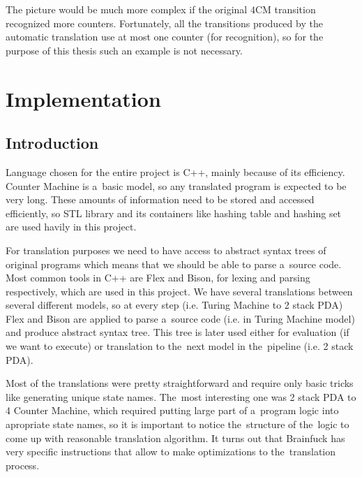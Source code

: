 \documentclass[english,shortabstract,mgr]{iithesis}
\begin{document}
The picture would be much more complex if the original $4$CM transition
recognized more counters. Fortunately, all the transitions produced by
the automatic translation use at most one counter (for recognition),
so for the purpose of this thesis such an example is not necessary.

\chapter{Implementation}

\section{Introduction}

Language chosen for the entire project is C++, mainly because of its efficiency. Counter Machine
is a~basic model, so any translated program is expected to be very long. These amounts of information
need to be stored and accessed efficiently, so STL library and its containers like hashing table
and hashing set are used havily in this project.

For translation purposes we need to have access to abstract syntax trees of original programs which
means that we should be able to parse a~source code. Most common tools in C++ are Flex and Bison,
for lexing and parsing respectively, which are used in this project. We have several translations
between several different models, so at every step (i.e. Turing Machine to 2 stack PDA) Flex and Bison
are applied to parse a~source code (i.e. in Turing Machine model) and produce abstract syntax tree.
This tree is later used either for evaluation (if we want to execute) or translation to the~next
model in the~pipeline (i.e. 2 stack PDA).

Most of the translations were pretty straightforward and require only basic tricks like
generating unique state names. The~most interesting one was 2 stack PDA to 4 Counter Machine,
which required putting large part of a~program logic into apropriate state names, so it is important
to notice the~structure of the~logic to come up with reasonable translation algorithm.
It turns out that Brainfuck has very specific instructions that allow to make optimizations
to the~translation process.
\end{document}
